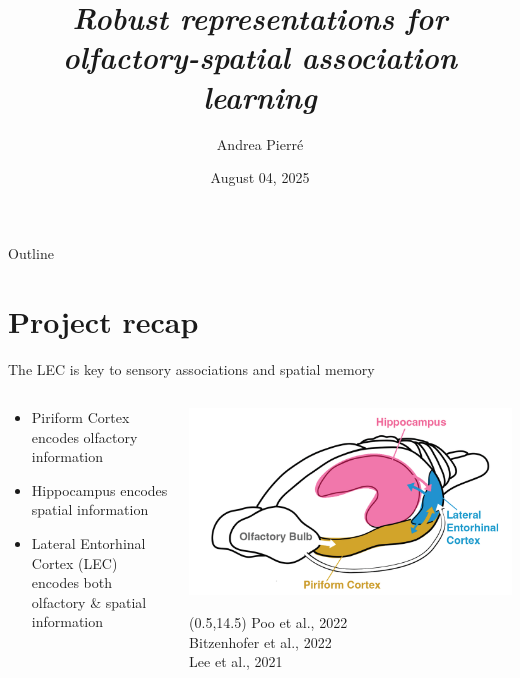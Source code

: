 \documentclass[bigger]{beamer}
\author{Andrea Pierré}
\date{August 04, 2025}
\title{\emph{Robust representations for olfactory-spatial association learning}}
\begin{document}
\maketitle
\begin{frame}[plain]{Outline}
\tableofcontents
\end{frame}

\section{Project recap}
\label{sec:org3a38fe1}
\begin{frame}[label={sec:orgba5a550}]{The LEC is key to sensory associations and spatial memory}
\begin{columns}
\begin{column}{0.45\columnwidth}
\footnotesize
\begin{itemize}
\item \alert{Piriform Cortex} encodes olfactory information
\item \alert{Hippocampus} encodes spatial information
\item \alert{Lateral Entorhinal Cortex (LEC)} encodes both olfactory \& spatial information
\end{itemize}
\end{column}
\begin{column}{0.55\columnwidth}
\begin{center}
\includegraphics[width=\textwidth]{medias/brain.png}
\end{center}

\begin{textblock}{5}(0.5,14.5)%
\tiny
Poo et al., 2022\\
Bitzenhofer et al., 2022\\
Lee et al., 2021
\end{textblock}
\end{column}
\end{columns}
\end{frame}
\end{document}
